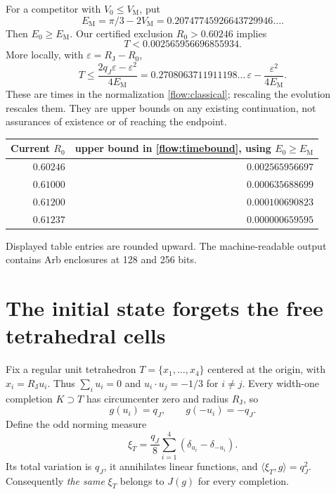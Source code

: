 \documentclass[11pt]{article}
\theoremstyle{remark}\newtheorem{remark}[theorem]{Remark}
\newcommand{\VM}{V_{\mathrm M}}
\newcommand{\RJ}{R_{\mathrm J}}
\newcommand{\EM}{E_{\mathrm M}}
\begin{document}
For a competitor with $V_0\leq\VM$, put
\[
 \EM=\pi/3-2\VM=0.20747745926643729946\ldots.
\]
Then $E_0\geq\EM$. Our certified exclusion $R_0>0.60246$ implies
\[
 T<0.002565956696855934.
\]
More locally, with $\varepsilon=\RJ-R_0$,
\begin{equation}\label{flow:asymptotic}
 T\leq\frac{2q_J\varepsilon-\varepsilon^2}{4\EM}
 =0.2708063711911198\ldots\,\varepsilon-\frac{\varepsilon^2}{4\EM}.
\end{equation}
These are times in the normalization \eqref{flow:classical}; rescaling the evolution rescales them. They are upper bounds on any existing continuation, not assurances of existence or of reaching the endpoint.

\begin{center}
\begin{tabular}{rr}\toprule
Current $R_0$ & upper bound in \eqref{flow:timebound}, using $E_0\geq\EM$\\\midrule
$0.60246$ & $0.002565956697$\\
$0.61000$ & $0.000635688699$\\
$0.61200$ & $0.000100690823$\\
$0.61237$ & $0.000000659595$\\\bottomrule
\end{tabular}
\end{center}
Displayed table entries are rounded upward. The machine-readable output contains Arb enclosures at 128 and 256 bits.

\section{The initial state forgets the free tetrahedral cells}
Fix a regular unit tetrahedron $T=\{x_1,\ldots,x_4\}$ centered at the origin, with $x_i=\RJ u_i$. Thus $\sum_i u_i=0$ and $u_i\cdot u_j=-1/3$ for $i\ne j$.
Every width-one completion $K\supset T$ has circumcenter zero and radius $\RJ$, so
\[
 g(u_i)=q_J,\qquad g(-u_i)=-q_J.
\]
Define the odd norming measure
\begin{equation}\label{flow:tetmeasure}
 \xi_T=\frac{q_J}{8}\sum_{i=1}^4(\delta_{u_i}-\delta_{-u_i}).
\end{equation}
Its total variation is $q_J$, it annihilates linear functions, and
$\langle\xi_T,g\rangle=q_J^2$. Consequently \emph{the same} $\xi_T$ belongs to $J(g)$ for every completion.
\end{document}
